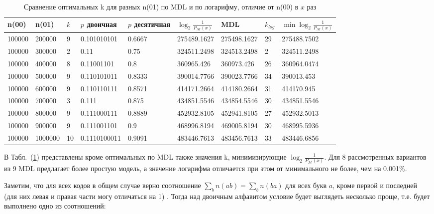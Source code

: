 \documentclass[12pt]{article}
\begin{document}
	\begin{table}[!h]
		\caption{Сравнение оптимальных k для разных n(01) по MDL и по логарифму, отличие от n(00) в $x$ раз}
		\label{table:comparison}
		\begin{center}
			\begin{tabular}{|l|l|l|l|l|l|l|l|l|}
				\hline
				n(00) & n(01) & $k$ & $p$ двоичная & $p$ десятичная & $\log_2{\frac{1}{P_{\mathcal{M}}(x)}}$& MDL & $k_{log}$ & $\min\log_2{\frac{1}{P_{\mathcal{M}}(x)}}$  \\
				\hline 
				100000 & 200000 & 9 & 0.101010101 & 0.6667 & 275489.1627 & 275498.1627 & 29 & 275488.7502 \\ 
				\hline 
				100000 & 300000 & 2 & 0.11 & 0.75 & 324511.2498 & 324513.2498 & 2 & 324511.2498 \\ 
				\hline 
				100000 & 400000 & 8 & 0.11001101 & 0.8 & 360965.426 & 360973.426 & 26 & 360964.0474 \\ 
				\hline 
				100000 & 500000 & 9 & 0.110101011 & 0.8333 & 390014.7766 & 390023.7766 & 34 & 390013.453 \\ 
				\hline 
				100000 & 600000 & 9 & 0.110110111 & 0.8571 & 414171.2664 & 414180.2664 & 31 & 414170.945 \\ 
				\hline 
				100000 & 700000 & 3 & 0.111 & 0.875 & 434851.5546 & 434854.5546 & 30 & 434851.5546 \\ 
				\hline 
				100000 & 800000 & 9 & 0.111000111 & 0.8889 & 452932.8105 & 452941.8105 & 27 & 452932.5013 \\ 
				\hline 
				100000 & 900000 & 9 & 0.111001101 & 0.9 & 468996.8194 & 469005.8194 & 30 & 468995.5936 \\ 
				\hline 
				100000 & 1000000 & 10 & 0.1110100011 & 0.9091 & 483446.7613 & 483456.7613 & 33 & 483446.6856 \\ 
				\hline 
			\end{tabular}
		\end{center}
	\end{table}
	
	В Табл.~(\ref{table:comparison}) представлены кроме оптимальных по MDL также значения k, минимизирующие $\log_2{\frac{1}{P_{\mathcal{M}}(x)}}$. Для 8 рассмотренных вариантов из 9 MDL предлагает более простую модель, а значение логарифма отличается при этом от минимального не более, чем на 0.001\%.

	Заметим, что для всех кодов в общем случае верно соотношение $\sum_b n(ab)=\sum_b n(ba)$ для всех букв $a$, кроме первой и последней (для них левая и правая части могу отличаться на 1) \cite[стр.~147]{teor_inf_ver}. Тогда над двоичным алфавитом условие будет выглядеть несколько проще, т.е. будет выполнено одно из соотношений:
	
\end{document}

